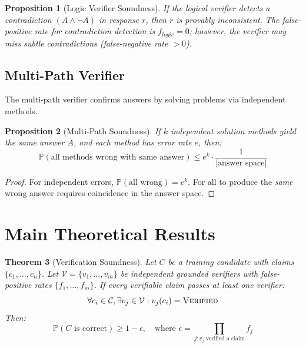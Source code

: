\documentclass[11pt,a4paper]{article}
\newtheorem{theorem}{Theorem}[section]
\newtheorem{proposition}[theorem]{Proposition}
\newcommand{\prob}{\mathbb{P}}
\newcommand{\calV}{\mathcal{V}}
\newcommand{\calC}{\mathcal{C}}
\begin{document}
\begin{proposition}[Logic Verifier Soundness]
\label{prop:logic}
If the logical verifier detects a contradiction $(A \land \lnot A)$ in response $r$, then $r$ is provably inconsistent. The false-positive rate for contradiction detection is $f_{logic} = 0$; however, the verifier may miss subtle contradictions (false-negative rate $> 0$).
\end{proposition}

\subsection{Multi-Path Verifier}
\label{sec:multipath}

The multi-path verifier confirms answers by solving problems via independent methods.

\begin{proposition}[Multi-Path Soundness]
\label{prop:multipath}
If $k$ independent solution methods yield the same answer $A$, and each method has error rate $e$, then:
\begin{equation}
    \prob(\text{all methods wrong with same answer}) \leq e^k \cdot \frac{1}{|\text{answer space}|}
\end{equation}
\end{proposition}

\begin{proof}
For independent errors, $\prob(\text{all wrong}) = e^k$. For all to produce the \emph{same} wrong answer requires coincidence in the answer space.
\end{proof}

\section{Main Theoretical Results}
\label{sec:theory}

\begin{theorem}[Verification Soundness]
\label{thm:soundness}
Let $C$ be a training candidate with claims $\{c_1, \ldots, c_n\}$. Let $\calV = \{v_1, \ldots, v_m\}$ be independent grounded verifiers with false-positive rates $\{f_1, \ldots, f_m\}$. If every verifiable claim passes at least one verifier:
\begin{equation}
    \forall c_i \in \calC, \exists v_j \in \calV: v_j(c_i) = \textsc{Verified}
\end{equation}
Then:
\begin{equation}
    \prob(C \text{ is correct}) \geq 1 - \epsilon, \quad \text{where } \epsilon = \prod_{j: v_j \text{ verified a claim}} f_j
\end{equation}
\end{theorem}
\end{document}
